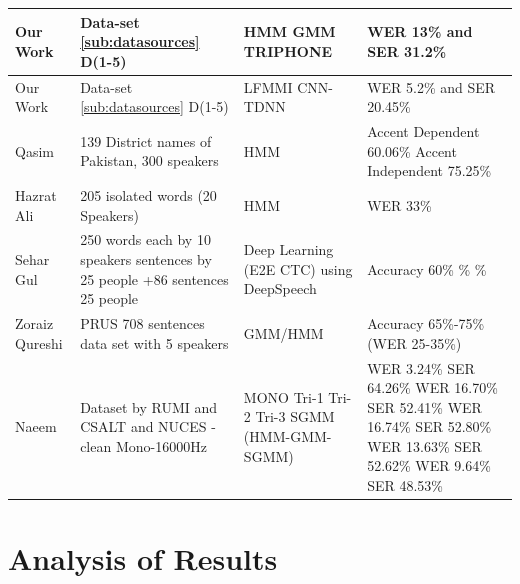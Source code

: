 \begin{landscape}
\begin{xltabular}{1.5\textwidth}{|l|X|X|X|}
\hline
\endlastfoot
    Our Work & Data-set \ref{sub:datasources} D(1-5) & HMM GMM TRIPHONE & WER 13\% and SER 31.2\%  \\ 
    \hline
    Our Work & Data-set \ref{sub:datasources} D(1-5) & LFMMI CNN-TDNN & WER 5.2\% and SER 20.45\%  \\   
    \hline
    Qasim \cite{qasim_urdu_2016} & 139 District names of Pakistan, 300 speakers & HMM & Accent Dependent 60.06\% \newline Accent Independent 75.25\% \\
    \hline
    Hazrat Ali \cite{ali_automatic_2015} & 205 isolated words (20 Speakers) & HMM &  WER 33\% \\
    \hline
    Sehar Gul \cite{sehar_gul_detecting_2020} &  250 words each by 10 speakers  sentences by 25 people +86 sentences 25 people \newline & Deep Learning (E2E CTC) using DeepSpeech & Accuracy 60\% \% \% \\
    \hline
    Zoraiz Qureshi \cite{qureshi_urdu_2021} & PRUS\cite{zia_pronouncur_2018} 708 sentences data set with 5 speakers & GMM/HMM& Accuracy 65\%-75\% (WER 25-35\%) \\
    \hline
    Naeem \cite{naeem_subspace_2020} & Dataset by RUMI and CSALT and NUCES - clean Mono-16000Hz & MONO \newline Tri-1 \newline Tri-2 \newline Tri-3 \newline SGMM \newline (HMM-GMM-SGMM) & WER 3.24\% SER 64.26\% \newline WER 16.70\% SER 52.41\% \newline WER 16.74\% SER 52.80\% \newline WER 13.63\% SER 52.62\% \newline WER 9.64\% SER 48.53\% \\
    \hline
\end{xltabular}
\end{landscape}

\section{Analysis of Results}
\label{se:discussion}

